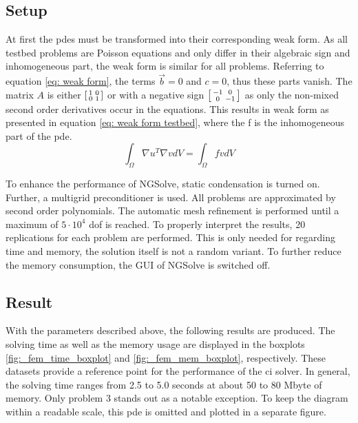 \documentclass[./\jobname.tex]{subfiles}
\begin{document}
\subsection{Setup}
At first the \gls{pde}s must be transformed into their corresponding weak form. As all testbed problems are Poisson equations and only differ in their algebraic sign and inhomogeneous part, the weak form is similar for all problems. Referring to equation \eqref{eq: weak form}, the terms $\vec{b} = 0$ and $c = 0$, thus these parts vanish. The matrix $A$ is either $\begin{bsmallmatrix} 1 & 0 \\ 0 & 1 \end{bsmallmatrix}$ or with a negative sign $\begin{bsmallmatrix} -1 & 0 \\ 0 & -1 \end{bsmallmatrix}$ as only the non-mixed second order derivatives occur in the equations. This results in weak form as presented in equation \eqref{eq: weak form testbed}, where the f is the inhomogeneous part of the \gls{pde}.
\begin{equation}
\label{eq: weak form testbed}
\int_{\Omega} \nabla u^T \nabla v dV = \int_{\Omega} f v dV
\end{equation}

To enhance the performance of NGSolve, static condensation is turned on. Further, a multigrid preconditioner is used. All problems are approximated by second order polynomials. The automatic mesh refinement is performed until a maximum of $5 \cdot 10^4$ \gls{dof} is reached. To properly interpret the results, 20 replications for each problem are performed. This is only needed for regarding time and memory, the solution itself is not a random variant. To further reduce the memory consumption, the GUI of NGSolve is switched off. 

\subsection{Result}
With the parameters described above, the following results are produced. The solving time as well as the memory usage are displayed in the boxplots \ref{fig:_fem_time_boxplot} and \ref{fig:_fem_mem_boxplot}, respectively. These datasets provide a reference point for the performance of the \gls{ci} solver. In general, the solving time ranges from 2.5 to 5.0 seconds at about 50 to 80 Mbyte of memory. Only problem 3 stands out as a notable exception. To keep the diagram within a readable scale, this \gls{pde} is omitted and plotted in a separate figure. 
\end{document}

